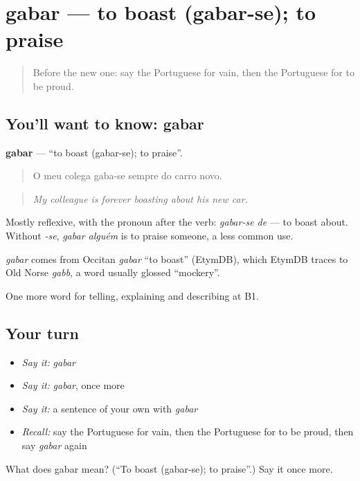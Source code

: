 \section[gabar]{gabar — to boast (gabar-se); to praise}

\label{lesson:PT-C467-gabar}



\begin{quote}
Before the new one: say the Portuguese for vain, then the Portuguese for to be proud.
\end{quote}

\subsection*{You'll want to know: gabar}
\textbf{gabar} — \textquotedblleft{}to boast (gabar-se); to praise\textquotedblright{}.

\begin{quote}
O meu colega gaba-se sempre do carro novo.
\end{quote}

\begin{quote}
\emph{My colleague is forever boasting about his new car.}
\end{quote}

Mostly reflexive, with the pronoun after the verb: \emph{gabar-se de} — to boast about. Without \emph{-se}, \emph{gabar alguém} is to praise someone, a less common use.

\begin{cousinweb}
\emph{gabar} comes from Occitan \emph{gabar} \textquotedblleft{}to boast\textquotedblright{} (EtymDB), which EtymDB traces to Old Norse \emph{gabb}, a word usually glossed \textquotedblleft{}mockery\textquotedblright{}.
\end{cousinweb}

\begin{grammarlens}[title={What you've built}]
One more word for telling, explaining and describing at B1.
\end{grammarlens}

\subsection*{Your turn}
\begin{itemize}
\raggedright
  \item \emph{Say it:} \emph{gabar}
  \item \emph{Say it:} \emph{gabar}, once more
  \item \emph{Say it:} a sentence of your own with \emph{gabar}
  \item \emph{Recall:} say the Portuguese for vain, then the Portuguese for to be proud, then say \emph{gabar} again
\end{itemize}

\begin{tcolorbox}[breakable,colback=teal!4,colframe=teal!35!black,title={Before you move on}]
What does gabar mean? (\textquotedblleft{}To boast (gabar-se); to praise\textquotedblright{}.) Say it once more.
\end{tcolorbox}
